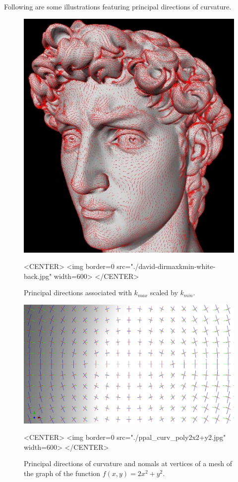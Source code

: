 Following are some illustrations featuring principal directions of curvature.

\begin{figure}[!ht]
\begin{ccTexOnly}
\centerline{
\includegraphics[width=.5\linewidth]{Jet_fitting_3/david-dirmaxkmin-jpg-white-back}}
\end{ccTexOnly}
\caption{Principal directions associated with $k_{max}$ scaled by $k_{min}$.}

\begin{ccHtmlOnly}
<CENTER> <img border=0 src="./david-dirmaxkmin-white-back.jpg" width=600>
</CENTER>
\end{ccHtmlOnly}
\end{figure}



\begin{figure}[!ht]
\begin{ccTexOnly}
\centerline{
\includegraphics[width=.5\linewidth]{Jet_fitting_3/ppal_curv_poly2x2+y2}}
\end{ccTexOnly}
\caption{Principal directions of curvature and nomals at vertices of a mesh of the
 graph of the function $f(x,y)=2x^2+y^2$.}

\begin{ccHtmlOnly}
<CENTER> <img border=0 src="./ppal_curv_poly2x2+y2.jpg" width=600>
</CENTER>
\end{ccHtmlOnly}
\end{figure}


